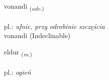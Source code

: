 \documentclass[frontgrid, backgrid]{flacards}\usepackage[]{graphicx}\usepackage[]{xcolor}
\begin{document}

\renewcommand{\flhead}{\vskip5pt \fboxsep=0pt {\small\bfseries\footnotesize Atviksorð | Adverb}}
\renewcommand{\fcfoot}{\vskip5pt \fboxsep=0pt \hspace{2pt}{\small\bfseries\footnotesize 2K}}

\renewcommand{\blhead}{\vskip5pt {\small\bfseries\footnotesize Atviksorð | Adverb }}
\renewcommand{\bcfoot}{\vskip5pt \hspace{2pt}{\small\bfseries\footnotesize 2K}}


{vonandi \small{\textsubscript{(\textit{adv.})}} \\[1ex]
\textphonetic{[vɔːnantɪ]} \\
pl.: \emph{ufnie, przy odrobinie szczęścia} \\  [2ex]
vonandi (Indeclinable)}

\renewcommand{\flhead}{\vskip5pt \fboxsep=0pt {\small\bfseries\footnotesize Nafnorð | Noun}}
\renewcommand{\fcfoot}{\vskip5pt \fboxsep=0pt \hspace{2pt}{\small\bfseries\footnotesize 2K}}

\renewcommand{\blhead}{\vskip5pt {\small\bfseries\footnotesize Nafnorð | Noun }}
\renewcommand{\bcfoot}{\vskip5pt \hspace{2pt}{\small\bfseries\footnotesize 2K}}


{eldur \small{\textsubscript{(\textit{m.})}} \\[1ex] %
\textphonetic{[ɛltʏr]} \\
pl.: \emph{ogień} \\  [2ex]
\renewcommand*{\arraystretch}{0.8}
}

\end{document}
